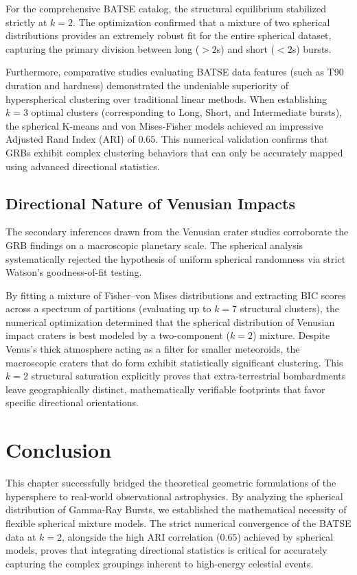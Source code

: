 \documentclass[12pt,a4paper]{report}
\begin{document}
For the comprehensive BATSE catalog, the structural equilibrium stabilized strictly at $k=2$. The optimization confirmed that a mixture of two spherical distributions provides an extremely robust fit for the entire spherical dataset, capturing the primary division between long ($> 2$s) and short ($< 2$s) bursts. 

Furthermore, comparative studies evaluating BATSE data features (such as T90 duration and hardness) demonstrated the undeniable superiority of hyperspherical clustering over traditional linear methods. When establishing $k=3$ optimal clusters (corresponding to Long, Short, and Intermediate bursts), the spherical K-means and von Mises-Fisher models achieved an impressive Adjusted Rand Index (ARI) of $0.65$. This numerical validation confirms that GRBs exhibit complex clustering behaviors that can only be accurately mapped using advanced directional statistics.

\subsection{Directional Nature of Venusian Impacts}
The secondary inferences drawn from the Venusian crater studies corroborate the GRB findings on a macroscopic planetary scale. The spherical analysis systematically rejected the hypothesis of uniform spherical randomness via strict Watson's goodness-of-fit testing. 

By fitting a mixture of Fisher–von Mises distributions and extracting BIC scores across a spectrum of partitions (evaluating up to $k=7$ structural clusters), the numerical optimization determined that the spherical distribution of Venusian impact craters is best modeled by a two-component ($k=2$) mixture. Despite Venus's thick atmosphere acting as a filter for smaller meteoroids, the macroscopic craters that do form exhibit statistically significant clustering. This $k=2$ structural saturation explicitly proves that extra-terrestrial bombardments leave geographically distinct, mathematically verifiable footprints that favor specific directional orientations.

\section{Conclusion}
This chapter successfully bridged the theoretical geometric formulations of the hypersphere to real-world observational astrophysics. By analyzing the spherical distribution of Gamma-Ray Bursts, we established the mathematical necessity of flexible spherical mixture models. The strict numerical convergence of the BATSE data at $k=2$, alongside the high ARI correlation ($0.65$) achieved by spherical models, proves that integrating directional statistics is critical for accurately capturing the complex groupings inherent to high-energy celestial events.
\end{document}
